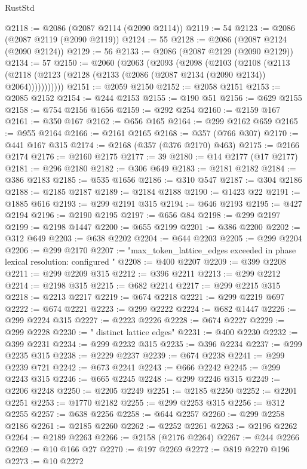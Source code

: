\begin{lexlean}{RustStd}
\begin{coremodule}
@2118 := @2086 (@2087 @2114 (@2090 @2114))
@2119 := 54
@2123 := @2086 (@2087 @2119 (@2090 @2119))
@2124 := 55
@2128 := @2086 (@2087 @2124 (@2090 @2124))
@2129 := 56
@2133 := @2086 (@2087 @2129 (@2090 @2129))
@2134 := 57
@2150 := @2060
    (@2063
      (@2093
        (@2098
          (@2103
            (@2108
              (@2113 (@2118 (@2123 (@2128 (@2133 (@2086 (@2087 @2134 (@2090 @2134)) @2064)))))))))))
@2151 := @2059 @2150
@2152 := @2058 @2151
@2153 := @2085 @2152
@2154 := @244 @2153
@2155 := @190 @51
@2156 := @629 @2155
@2158 := @754 @2156 @1656
@2159 := @292 @254
@2160 := @2159 @167
@2161 := @350 @167
@2162 := @656 @165
@2164 := @299 @2162 @659
@2165 := @955 @2164
@2166 := @2161 @2165
@2168 := @357 (@766 @307)
@2170 := @441 @167 @315
@2174 := @2168 (@357 (@376 @2170) @463)
@2175 := @2166 @2174
@2176 := @2160 @2175
@2177 := 39
@2180 := @14 @2177 (@17 @2177)
@2181 := @296 @2180
@2182 := @306 @649
@2183 := @2181 @2182
@2184 := @386 @2183
@2185 := @535 @1656
@2186 := @310 @547
@2187 := @304 @2186
@2188 := @2185 @2187
@2189 := @2184 @2188
@2190 := @1423 @22
@2191 := @1885 @616
@2193 := @299 @2191 @315
@2194 := @646 @2193
@2195 := @427 @2194
@2196 := @2190 @2195
@2197 := @656 @84
@2198 := @299 @2197
@2199 := @2198 @1447
@2200 := @655 @2199
@2201 := @386 @2200
@2202 := @312 @649
@2203 := @638 @2202
@2204 := @644 @2203
@2205 := @299 @2204
@2206 := @299 @2170
@2207 := "max_token_lattice_edges exceeded in phase lexical resolution: configured "
@2208 := @400 @2207
@2209 := @399 @2208
@2211 := @299 @2209 @315
@2212 := @396 @2211
@2213 := @299 @2212
@2214 := @2198 @315
@2215 := @682 @2214
@2217 := @299 @2215 @315
@2218 := @2213 @2217
@2219 := @674 @2218
@2221 := @299 @2219 @697
@2222 := @674 @2221
@2223 := @299 @2222
@2224 := @682 @1447
@2226 := @299 @2224 @315
@2227 := @2223 @2226
@2228 := @674 @2227
@2229 := @299 @2228
@2230 := " distinct lattice edges"
@2231 := @400 @2230
@2232 := @399 @2231
@2234 := @299 @2232 @315
@2235 := @396 @2234
@2237 := @299 @2235 @315
@2238 := @2229 @2237
@2239 := @674 @2238
@2241 := @299 @2239 @721
@2242 := @673 @2241
@2243 := @666 @2242
@2245 := @299 @2243 @315
@2246 := @665 @2245
@2248 := @299 @2246 @315
@2249 := @2206 @2248
@2250 := @2205 @2249
@2251 := @2185 @2250
@2252 := @2201 @2251
@2253 := @1770 @2182
@2255 := @299 @2253 @315
@2256 := @312 @2255
@2257 := @638 @2256
@2258 := @644 @2257
@2260 := @299 @2258 @2186
@2261 := @2185 @2260
@2262 := @2252 @2261
@2263 := @2196 @2262
@2264 := @2189 @2263
@2266 := @2158 (@2176 @2264)
@2267 := @244 @2266
@2269 := @10 @166 @27
@2270 := @197 @2269
@2272 := @819 @2270 @196
@2273 := @10 @2272

\end{coremodule}
\end{lexlean}
